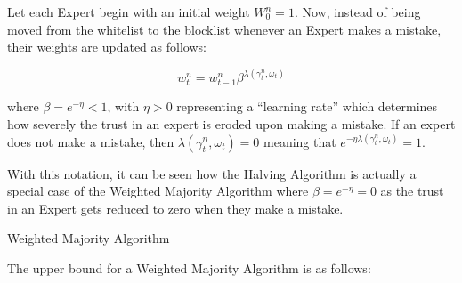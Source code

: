 Let each Expert begin with an initial weight $W^n_0 = 1$. Now, instead of being moved from the whitelist to the blocklist whenever an Expert makes a mistake, their weights are updated as follows:

\begin{equation}
    w^n_t = w^n_{t-1} \beta^{\lambda(\gamma^n_t, \omega_t)}
\end{equation}

where $\beta = e^{-\eta} < 1$, with $\eta > 0$ representing a ``learning rate'' which determines how severely the trust in an expert is eroded upon making a mistake. If an expert does not make a mistake, then $\lambda(\gamma^n_t, \omega_t) = 0$ meaning that $e^{-\eta \lambda(\gamma^n_t, \omega_t)} = 1$.

With this notation, it can be seen how the Halving Algorithm is actually a special case of the Weighted Majority Algorithm where $\beta = e^{-\eta} = 0$ as the trust in an Expert gets reduced to zero when they make a mistake.

\begin{algorithm}[ht]
    \caption{Weighted Majority Algorithm}\label{weighted_majority_algorithm}
    \begin{algorithmic}[1]
    \end{algorithmic}
\end{algorithm}

The upper bound for a Weighted Majority Algorithm is as follows:

